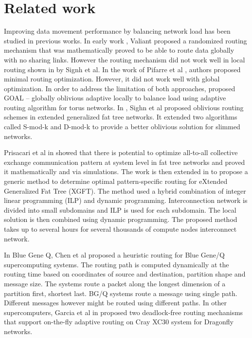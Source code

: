\section{Related work}
\label{sec:relatedwork}

Improving data movement performance by balancing network load has been studied in previous works. In early work \cite{Valiant81:Routing}, Valiant proposed a randomized routing mechanism that was mathematically proved to be able to route data globally with no sharing links. However the routing mechanism did not work well in local routing shown in \cite{singh2003:GOAL} by Signh et al. In the work of Pifarre et al \cite{Pifarre91}, authors proposed minimal routing optimization. However, it did not work well with global optimization. In order to address the limitation of both approaches, \cite{singh2003:GOAL} proposed GOAL – globally oblivious adaptive locally to balance load using adaptive routing algorithm for torus networks. In \cite{Rodriguez09}, Sighn et al proposed oblivious routing schemes in extended generalized fat tree networks. It extended two algorithms called S-mod-k and D-mod-k to provide a better oblivious solution for slimmed networks. 

Prisacari et al in \cite{Prisacari13a} showed that there is potential to optimize all-to-all collective exchange communication pattern at system level in fat tree networks and proved it mathematically and via simulations. The work is then extended in \cite{Prisacari13b} to propose a generic method to determine optimal pattern-specific routing for eXtended Generalized Fat Tree (XGFT). The method used a hybrid combination of integer linear programming (ILP) and dynamic programming. Interconnection network is divided into small subdomains and ILP is used for each subdomain. The local solution is then combined using dynamic programming. The proposed method takes up to several hours for several thousands of compute nodes interconnect network.

In Blue Gene Q, Chen et al \cite{Chen:BGQ} proposed a heuristic routing for Blue Gene/Q supercomputing systems. The routing path is computed dynamically at the routing time based on coordinates of source and destination, partition shape and message size. The systems route a packet along the longest dimension of a partition first, shortest last. BG/Q systems route a message using single path. Different messages however might be routed using different paths. In other supercomputers, Garcia et al in \cite{garcia2013:CrayDragonfly} proposed two deadlock-free routing mechanisms that support on-the-fly adaptive routing on Cray XC30 system for Dragonfly networks.

